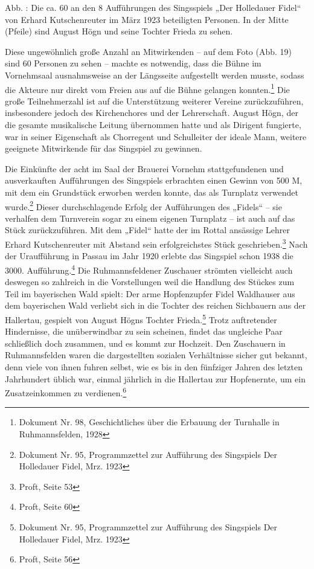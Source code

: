 \documentclass[a4paper]{article}
\newcounter{Abb}
\renewcommand\theAbb{\arabic{Abb}}
\begin{document}
\label{bkm:Ref100050511}Abb. \stepcounter{Abb}{\theAbb}: Die ca. 60 an
den 8 Aufführungen des Singsspiels „Der Holledauer Fidel“ von Erhard
Kutschenreuter im März 1923 beteiligten Personen. In der Mitte (Pfeile)
sind August Högn und seine Tochter Frieda zu sehen. 

Diese ungewöhnlich große Anzahl an Mitwirkenden – auf dem Foto (Abb. 19)
sind 60 Personen zu sehen – machte es notwendig, dass die Bühne im
Vornehmsaal ausnahmsweise an der Längsseite aufgestellt werden musste,
sodass die Akteure nur direkt vom Freien aus auf die Bühne gelangen
konnten.\footnote{ Dokument Nr. 98, Geschichtliches über die Erbauung
der Turnhalle in Ruhmannsfelden, 1928} Die große Teilnehmerzahl ist auf
die Unterstützung weiterer Vereine zurückzuführen, insbesondere jedoch
des Kirchenchores und der Lehrerschaft. August Högn, der die gesamte
musikalische Leitung übernommen hatte und als Dirigent fungierte, war
in seiner Eigenschaft als Chorregent und Schulleiter der ideale Mann,
weitere geeignete Mitwirkende für das Singspiel zu gewinnen. 

Die Einkünfte der acht im Saal der Brauerei Vornehm stattgefundenen und
ausverkauften Aufführungen des Singspiels erbrachten einen Gewinn von
500 M, mit dem ein Grundstück erworben werden konnte, das als Turnplatz
verwendet wurde.\footnote{ Dokument Nr. 95, Programmzettel zur
Aufführung des Singspiels {\textquotedbl}Der Holledauer
Fidel{\textquotedbl}, Mrz. 1923} Dieser durchschlagende Erfolg der
Aufführungen des „Fidels“ – sie verhalfen dem Turnverein sogar zu einem
eigenen Turnplatz – ist auch auf das Stück zurückzuführen. Mit dem
„Fidel“ hatte der im Rottal ansässige Lehrer Erhard Kutschenreuter mit
Abstand sein erfolgreichstes Stück geschrieben.\footnote{ Proft, Seite
53} Nach der Uraufführung in Passau im Jahr 1920 erlebte das Singspiel
schon 1938 die 3000. Aufführung.\footnote{ Proft, Seite 60} Die
Ruhmannsfeldener Zuschauer strömten vielleicht auch deswegen so
zahlreich in die Vorstellungen weil die Handlung des Stückes zum Teil
im bayerischen Wald spielt: Der arme Hopfenzupfer Fidel Waldhauser aus
dem bayerischen Wald verliebt sich in die Tochter des reichen
Sichbauern aus der Hallertau, gespielt von August Högns Tochter
Frieda.\footnote{ Dokument Nr. 95, Programmzettel zur Aufführung des
Singspiels {\textquotedbl}Der Holledauer Fidel{\textquotedbl}, Mrz.
1923} Trotz auftretender Hindernisse, die unüberwindbar zu sein
scheinen, findet das ungleiche Paar schließlich doch zusammen, und es
kommt zur Hochzeit. Den Zuschauern in Ruhmannsfelden waren die
dargestellten sozialen Verhältnisse sicher gut bekannt, denn viele von
ihnen fuhren selbst, wie es bis in den fünfziger Jahren des letzten
Jahrhundert üblich war, einmal jährlich in die Hallertau zur
Hopfenernte, um ein Zusatzeinkommen zu verdienen.\footnote{ Proft,
Seite 56}
\end{document}
